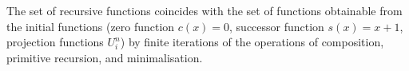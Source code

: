 The set of recursive functions coincides with the set of functions obtainable from the initial functions (zero function $c(x) = 0$, successor function $s(x) = x+1$, projection functions $U_i^n$) by finite iterations of the operations of composition, primitive recursion, and minimalisation.
